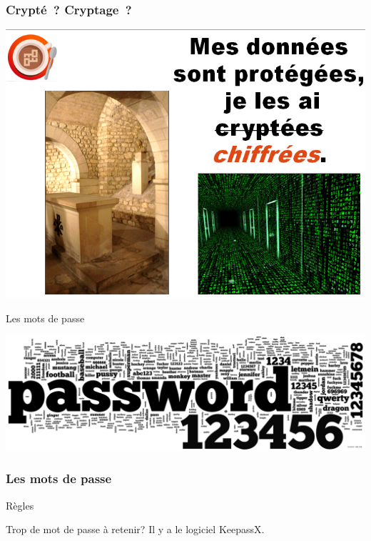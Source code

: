 \documentclass{beamer}
\begin{document}
\begin{frame}
\frametitle{Crypté ? Cryptage ?}
\begin{center}
\includegraphics[scale=0.5]{./images/chiffrees_vs_cryptees.png}
\end{center}
\end{frame}

\begin{frame}
\Huge{\centerline{Les mots de passe}}

\begin{center}
\includegraphics[scale=0.6] {./images/password.png}
\end{center}
\end{frame}

\begin{frame}
\frametitle{Les mots de passe}
\begin{block}{Règles}
\begin{itemize}
\end{itemize}
\end{block}
\begin{block}{Trop de mot de passe à retenir?}
Il y a le logiciel KeepassX.
\end{block}
\end{frame}
\end{document}
